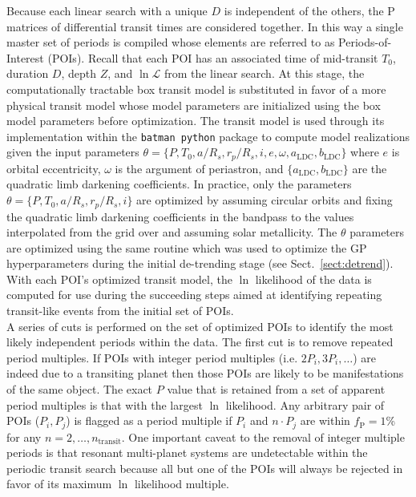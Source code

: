 Because each linear search with a unique $D$ is independent of the others, the P matrices of
differential transit times are considered together. In this way a single master set of periods
is compiled whose elements are referred to as Periods-of-Interest (POIs). Recall that each POI has
an associated time of mid-transit $T_0$, duration $D$, depth $Z$, and $\ln{\mathcal{L}}$
from the linear search. At this stage,
the computationally tractable box transit model is substituted in favor of a more
physical transit model whose model parameters are initialized using the box model parameters before
optimization. The \cite{mandel02} transit model is used through its implementation within the
\texttt{batman python} package \citep{kreidberg15} to
compute model realizations given the input parameters
$\theta=\{P, T_0,a/R_s, r_p/R_s,i,e,\omega,a_{\text{LDC}},b_{\text{LDC}}\}$ where $e$ is orbital eccentricity,
$\omega$ is the argument of periastron, and $\{a_{\text{LDC}},b_{\text{LDC}}\}$ are the quadratic limb
darkening coefficients. In practice, only
the parameters $\theta=\{P,T_0,a/R_s,r_p/R_s,i\}$ are optimized by assuming circular orbits and fixing
the quadratic limb darkening coefficients in the \tess{} bandpass to the values interpolated
from the \cite{claret17} grid over \teff{,} \logg{,} and assuming solar metallicity. The $\theta$
parameters are optimized using the same routine which was used to optimize the GP hyperparameters during
the initial de-trending stage (see Sect.~\ref{sect:detrend}). With each POI's optimized transit
model, the $\ln$ likelihood of the data is computed for use during the succeeding steps
aimed at identifying repeating transit-like events from the initial set of POIs. \\

A series of cuts is performed on the set of optimized POIs to identify the most likely independent
periods within the data. The first cut is to remove repeated period multiples.
If POIs with integer period multiples (i.e. $2P_i,3P_i,\dots$) are indeed due to a transiting planet
then those POIs are likely to be manifestations of the same object. The exact $P$ value that is retained
from a set of apparent period multiples is that
with the largest $\ln$ likelihood. Any arbitrary pair of POIs ($P_i,P_j$) is flagged
as a period multiple if $P_i$ and $n\cdot P_j$ are within $f_{\text{P}}=1$\% for any
$n=2,\dots,n_{\text{transit}}$. 
One important caveat to the removal of integer multiple periods is that resonant multi-planet systems
are undetectable within the periodic transit search because all but one of the POIs will always be
rejected in favor of its maximum $\ln$ likelihood multiple. \\

